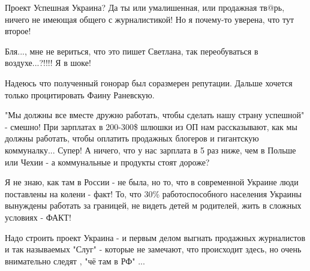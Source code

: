 \begin{itemize}
 
Проект Успешная Украина? Да ты или умалишенная, или продажная тв@рь, ничего не имеющая общего с журналистикой! Но я почему-то уверена, что тут второе!

 
Бля..., мне не вериться, что это пишет Светлана, так переобуваться в воздухе...?!!!! Я в шоке!

 
Надеюсь что полученный гонорар был соразмерен репутации. Дальше хочется только процитировать Фаину Раневскую.


"Мы должны все вместе дружно работать, чтобы сделать нашу страну успешной" -
смешно! При зарплатах в 200-300\$ шлюшки из ОП нам рассказывают, как мы должны
работать, чтобы оплатить продажных блогеров и гигантскую коммуналку... Супер! А
ничего, что у нас зарплата в 5 раз ниже, чем в Польше или Чехии - а
коммунальные и продукты стоят дороже? 

Я не знаю, как там в России - не была, но то, что в современной Украине люди
поставлены на колени - факт! То, что 30\% работоспособного населения Украины
вынуждены работать за границей, не видеть детей м родителей, жить в сложных
условиях - ФАКТ! 

Надо строить проект Украина - и первым делом выгнать продажных журналистов и
так называемых "Слуг" - которые не замечают, что происходит здесь, но очень
внимательно следят , "чё там в РФ" ...

\begin{itemize}
 

\end{itemize}
\end{itemize}
